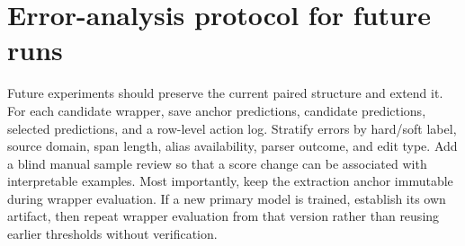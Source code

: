 \section{Error-analysis protocol for future runs}

Future experiments should preserve the current paired structure and extend it. For each candidate wrapper, save anchor predictions, candidate predictions, selected predictions, and a row-level action log. Stratify errors by hard/soft label, source domain, span length, alias availability, parser outcome, and edit type. Add a blind manual sample review so that a score change can be associated with interpretable examples. Most importantly, keep the extraction anchor immutable during wrapper evaluation. If a new primary model is trained, establish its own artifact, then repeat wrapper evaluation from that version rather than reusing earlier thresholds without verification.
